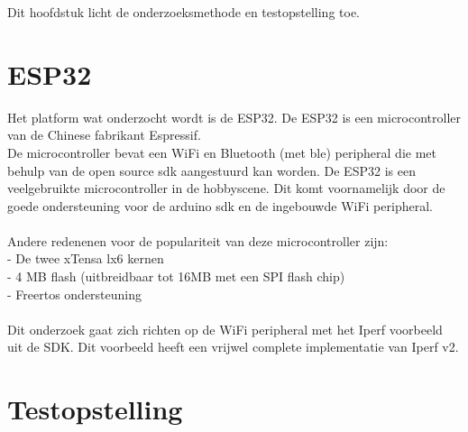 \documentclass[../DCM2_Verslag.tex]{subfiles}
\begin{document}
Dit hoofdstuk licht de onderzoeksmethode en testopstelling toe. 

\section{ESP32}
Het platform wat onderzocht wordt is de ESP32. De ESP32 is een microcontroller van de Chinese fabrikant Espressif.\\ De microcontroller bevat een WiFi en Bluetooth (met ble) peripheral die met behulp van de open source sdk aangestuurd kan worden. De ESP32 is een veelgebruikte microcontroller in de hobbyscene. Dit komt voornamelijk door de goede ondersteuning voor de arduino sdk en de ingebouwde WiFi peripheral.
\\\\
Andere redenenen voor de populariteit van deze microcontroller zijn:\\
- De twee xTensa lx6 kernen\\
- 4 MB flash (uitbreidbaar tot 16MB met een SPI flash chip)\\
- Freertos ondersteuning\\\\
Dit onderzoek gaat zich richten op de WiFi peripheral met het Iperf voorbeeld uit de SDK. Dit voorbeeld heeft een vrijwel complete implementatie van Iperf v2. 
\section{Testopstelling}
\end{document}
